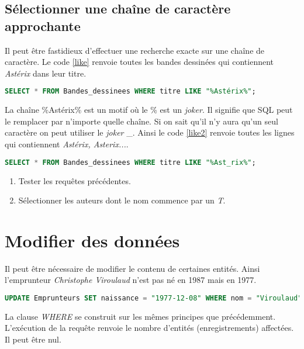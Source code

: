 \documentclass[a4paper,11pt]{article}
\begin{document}
\begin{Form}
\subsection{Sélectionner une chaîne de caractère approchante}
Il peut être fastidieux d'effectuer une recherche exacte sur une chaîne de caractère. Le code \ref{like} renvoie toutes les bandes dessinées qui contiennent \emph{Astérix} dans leur titre.
\begin{center}
\begin{lstlisting}[language=SQL]
SELECT * FROM Bandes_dessinees WHERE titre LIKE "%Astérix%";
\end{lstlisting}
\label{like}
\end{center}
La chaîne \%Astérix\% est un motif où le \% est un \emph{joker}. Il signifie que SQL peut le remplacer par n'importe quelle chaîne. Si on sait qu'il n'y aura qu'un seul caractère on peut utiliser le \emph{joker} \_. Ainsi le code \ref{like2} renvoie toutes les lignes qui contiennent \emph{Astérix, Asterix...}.
\begin{center}
\begin{lstlisting}[language=SQL]
SELECT * FROM Bandes_dessinees WHERE titre LIKE "%Ast_rix%";
\end{lstlisting}
\label{like2}
\end{center}
\begin{activite}
\begin{enumerate}
\item Tester les requêtes précédentes.
\item Sélectionner les auteurs dont le nom commence par un \emph{T}.
\end{enumerate}
\end{activite}
\section{Modifier des données}
Il peut être nécessaire de modifier le contenu de certaines entités. Ainsi l'emprunteur \emph{Christophe Viroulaud} n'est pas né en 1987 mais en 1977.
\begin{center}
\begin{lstlisting}[language=SQL]
UPDATE Emprunteurs SET naissance = "1977-12-08" WHERE nom = "Viroulaud";
\end{lstlisting}
\label{update}
\end{center}
La clause \emph{WHERE} se construit sur les mêmes principes que précédemment. L'exécution de la requête renvoie le nombre d'entités (enregistrements) affectées. Il peut être nul.

\end{Form}
\end{document}
